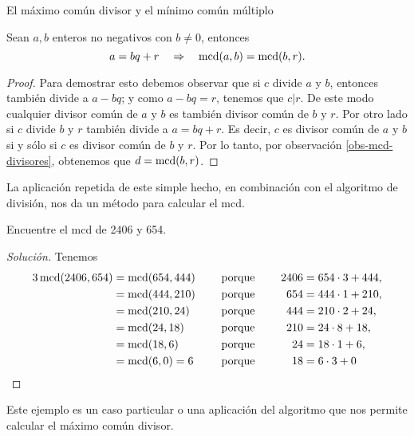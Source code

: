 \begin{section}{El máximo común divisor y el mínimo común múltiplo}
\begin{proposicion}\label{prop-alg-eucl} Sean  $a,b$ enteros no negativos con $b \not=0$, entonces 
    \begin{equation}\label{bec}
    a=bq+r\quad \Rightarrow \quad\operatorname{mcd}(a,b)=\operatorname{mcd}(b,r).
    \end{equation}
\end{proposicion}
\begin{proof}
    Para demostrar esto debemos observar que si $c$ divide $a$ y $b$, entonces también divide a $a-bq$; y como $a-bq=r$, tenemos que $c|r$. De este modo cualquier divisor común de $a$ y $b$ es también divisor común de $b$ y $r$.  Por otro lado si $c$ divide $b$ y $r$ también divide a $a=bq+r$. Es decir, $c$ es divisor común de $a$ y $b$ si y sólo si $c$ es divisor común de $b$ y $r$. Por lo tanto, por observación \ref{obs-mcd-divisores}, obtenemos que $d = \operatorname{mcd}(b,r)$.
\end{proof}

La aplicación repetida de este simple hecho, en combinación con el algoritmo de división, nos da un método para calcular el mcd.

\begin{ejemplo*} Encuentre el mcd de 2406 y 654.
\end{ejemplo*}
\begin{proof}[Solución] Tenemos
    \begin{alignat*}3
    \mcd(2406,654)&=\mcd(654,444)&\quad &\text{ porque }\quad& 2406&=654\cdot3+444,\\
    &=\mcd(444,210)& &\text{ porque }\quad& 654&=444\cdot1+210,\\
    &=\mcd(210,24)&& \text{ porque }\quad &444&=210\cdot2+24,\\
    &=\mcd(24,18) && \text{ porque }\quad &210&=24\cdot8+18,\\
    &=\mcd(18,6)  && \text{ porque }\quad &24 &=18\cdot1+6,\\
    & =\mcd(6,0) = 6           &&\text{ porque }\quad&18&=6\cdot3 + 0
    \end{alignat*}
    
\end{proof}

Este ejemplo es un caso particular o una aplicación del algoritmo que nos permite calcular el máximo común divisor.






\end{section}

